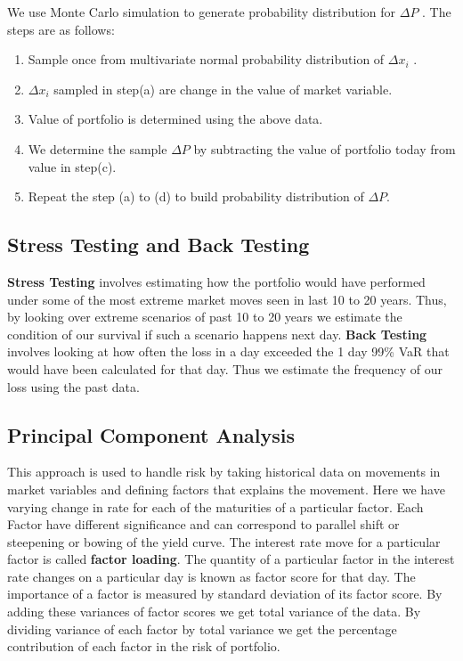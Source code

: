 \documentclass[11pt]{article}
\numberwithin{equation}{section}
\begin{document}
\begin{enumerate}
	We use Monte Carlo simulation to generate probability distribution for $\Delta P $ . The steps are as follows: 
	\begin{enumerate}
	\item Sample once from multivariate normal probability distribution of $ \Delta x_i $ .
	\item $ \Delta x_i $ sampled in step(a) are change in the value of market variable.
	\item Value of portfolio is determined using the above data.
	\item We determine the sample $\Delta P$ by subtracting the value of portfolio today from value in step(c).
	\item Repeat the step (a) to (d) to build probability distribution of $\Delta P$.
	\end{enumerate}
	\end{enumerate}
	

\subsection{Stress Testing and Back Testing}\medskip

\textbf{Stress Testing} involves estimating how the portfolio would have performed under some of the most extreme market moves seen in last 10 to 20 years. Thus, by looking over extreme scenarios of past 10 to 20 years we estimate the condition of our survival if such a scenario happens next day.  \textbf{Back Testing} involves looking at how often the loss in a day exceeded the 1 day 99\% VaR that would have been calculated for that day. Thus we estimate the frequency of our loss using the past data.

\subsection{Principal Component Analysis}

This approach is used to handle risk by taking historical data on movements in market variables and defining factors that explains the movement. Here we have varying change in rate for each of the maturities of a particular factor. Each Factor have different significance and can correspond to parallel shift or steepening or bowing of the yield curve. The interest rate move for a particular factor is called \textbf{factor loading}. The quantity of a particular factor in the interest rate changes on a particular day is known as factor score for that day. The importance of a factor is measured by standard deviation of its factor score. By adding these variances of factor scores we get total variance of the data. By dividing variance of each factor by total variance we get the percentage contribution of each factor in the risk of portfolio.
\end{document}
